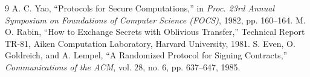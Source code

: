\documentclass{SYSUReport}
\begin{document}
\begin{thebibliography}{9}
 A. C. Yao, ``Protocols for Secure Computations,'' in \textit{Proc. 23rd Annual Symposium on Foundations of Computer Science (FOCS)}, 1982, pp. 160--164.
 M. O. Rabin, ``How to Exchange Secrets with Oblivious Transfer,'' Technical Report TR-81, Aiken Computation Laboratory, Harvard University, 1981.
 S. Even, O. Goldreich, and A. Lempel, ``A Randomized Protocol for Signing Contracts,'' \textit{Communications of the ACM}, vol. 28, no. 6, pp. 637--647, 1985.
\end{thebibliography}

%     
\end{document}
